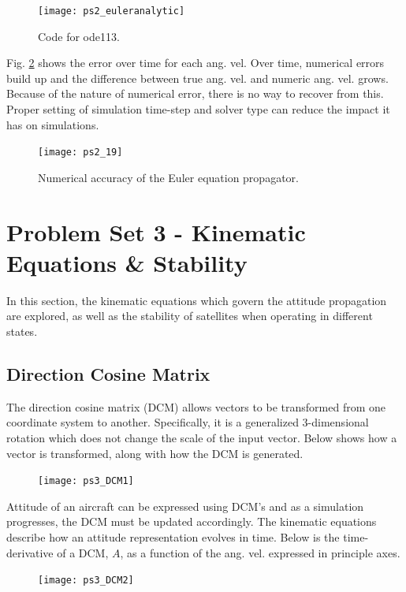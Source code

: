 \documentclass[12pt, letterpaper]{article}
\begin{document}
\begin{figure}[H]
	\centering
	\texttt{[image: ps2\_euleranalytic]}
	\caption{Code for ode113.}
	\label{2:codeEuler}
\end{figure}

Fig. \ref{2:error} shows the error over time for each ang. vel. Over time, numerical errors build up and the difference between true ang. vel. and numeric ang. vel. grows. Because of the nature of numerical error, there is no way to recover from this. Proper setting of simulation time-step and solver type can reduce the impact it has on simulations.

\begin{figure}[H]
	\centering
	\texttt{[image: ps2\_19]}
	\caption{Numerical accuracy of the Euler equation propagator.}
	\label{2:error}
\end{figure}




\section{Problem Set 3 - Kinematic Equations \& Stability}

In this section, the kinematic equations which govern the attitude propagation are explored, as well as the stability of satellites when operating in different states.

\subsection{Direction Cosine Matrix}

The direction cosine matrix (DCM) allows vectors to be transformed from one coordinate system to another. Specifically, it is a generalized 3-dimensional rotation which does not change the scale of the input vector. Below shows how a vector is transformed, along with how the DCM is generated.

\begin{figure}[H]
	\centering
	\texttt{[image: ps3\_DCM1]}
\end{figure}

Attitude of an aircraft can be expressed using DCM's and as a simulation progresses, the DCM must be updated accordingly. The kinematic equations describe how an attitude representation evolves in time. Below is the time-derivative of a DCM, $A$, as a function of the ang. vel. expressed in principle axes.

\begin{figure}[H]
	\centering
	\texttt{[image: ps3\_DCM2]}
\end{figure}
\end{document}
